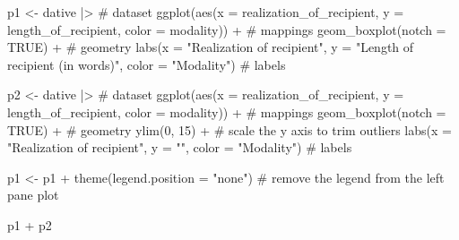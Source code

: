 \documentclass[
  letterpaper,
]{latex/krantz}
\newenvironment{Shaded}{\begin{snugshade}}{\end{snugshade}}
\newcommand{\AttributeTok}[1]{\textcolor[rgb]{0.40,0.45,0.13}{#1}}
\newcommand{\CommentTok}[1]{\textcolor[rgb]{0.37,0.37,0.37}{#1}}
\newcommand{\ConstantTok}[1]{\textcolor[rgb]{0.56,0.35,0.01}{#1}}
\newcommand{\DecValTok}[1]{\textcolor[rgb]{0.68,0.00,0.00}{#1}}
\newcommand{\FunctionTok}[1]{\textcolor[rgb]{0.28,0.35,0.67}{#1}}
\newcommand{\NormalTok}[1]{\textcolor[rgb]{0.00,0.23,0.31}{#1}}
\newcommand{\OtherTok}[1]{\textcolor[rgb]{0.00,0.23,0.31}{#1}}
\newcommand{\SpecialCharTok}[1]{\textcolor[rgb]{0.37,0.37,0.37}{#1}}
\newcommand{\StringTok}[1]{\textcolor[rgb]{0.13,0.47,0.30}{#1}}
\begin{document}
\begin{Shaded}
\begin{Highlighting}[]
\NormalTok{p1 }\OtherTok{\textless{}{-}} 
\NormalTok{  dative }\SpecialCharTok{|\textgreater{}} \CommentTok{\# dataset}
  \FunctionTok{ggplot}\NormalTok{(}\FunctionTok{aes}\NormalTok{(}\AttributeTok{x =}\NormalTok{ realization\_of\_recipient, }\AttributeTok{y =}\NormalTok{ length\_of\_recipient, }\AttributeTok{color =}\NormalTok{ modality)) }\SpecialCharTok{+} \CommentTok{\# mappings}
  \FunctionTok{geom\_boxplot}\NormalTok{(}\AttributeTok{notch =} \ConstantTok{TRUE}\NormalTok{) }\SpecialCharTok{+} \CommentTok{\# geometry}
  \FunctionTok{labs}\NormalTok{(}\AttributeTok{x =} \StringTok{"Realization of recipient"}\NormalTok{, }\AttributeTok{y =} \StringTok{"Length of recipient (in words)"}\NormalTok{, }\AttributeTok{color =} \StringTok{"Modality"}\NormalTok{) }\CommentTok{\# labels}

\NormalTok{p2 }\OtherTok{\textless{}{-}} 
\NormalTok{  dative }\SpecialCharTok{|\textgreater{}} \CommentTok{\# dataset}
  \FunctionTok{ggplot}\NormalTok{(}\FunctionTok{aes}\NormalTok{(}\AttributeTok{x =}\NormalTok{ realization\_of\_recipient, }\AttributeTok{y =}\NormalTok{ length\_of\_recipient, }\AttributeTok{color =}\NormalTok{ modality)) }\SpecialCharTok{+} \CommentTok{\# mappings}
  \FunctionTok{geom\_boxplot}\NormalTok{(}\AttributeTok{notch =} \ConstantTok{TRUE}\NormalTok{) }\SpecialCharTok{+} \CommentTok{\# geometry}
  \FunctionTok{ylim}\NormalTok{(}\DecValTok{0}\NormalTok{, }\DecValTok{15}\NormalTok{) }\SpecialCharTok{+} \CommentTok{\# scale the y axis to trim outliers}
  \FunctionTok{labs}\NormalTok{(}\AttributeTok{x =} \StringTok{"Realization of recipient"}\NormalTok{, }\AttributeTok{y =} \StringTok{""}\NormalTok{, }\AttributeTok{color =} \StringTok{"Modality"}\NormalTok{) }\CommentTok{\# labels}

\NormalTok{p1 }\OtherTok{\textless{}{-}}\NormalTok{ p1 }\SpecialCharTok{+} \FunctionTok{theme}\NormalTok{(}\AttributeTok{legend.position =} \StringTok{"none"}\NormalTok{) }\CommentTok{\# remove the legend from the left pane plot}

\NormalTok{p1 }\SpecialCharTok{+}\NormalTok{ p2}
\end{Highlighting}
\end{Shaded}
\end{document}
